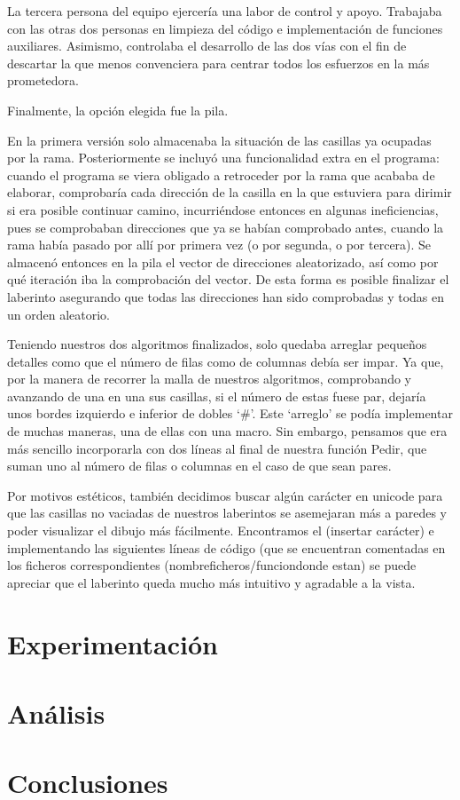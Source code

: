 \documentclass[12pt,a4paper]{article}
\begin{document}
La tercera persona del equipo ejercería una labor de control y apoyo. Trabajaba con las otras dos personas en limpieza del código e implementación de funciones auxiliares. Asimismo, controlaba el desarrollo de las dos vías con el fin de descartar la que menos convenciera para centrar todos los esfuerzos en la más prometedora.  

Finalmente, la opción elegida fue la pila.  

En la primera versión solo almacenaba la situación de las casillas ya ocupadas por la rama. Posteriormente se incluyó una funcionalidad extra en el programa: cuando el programa se viera obligado a retroceder por la rama que acababa de elaborar, comprobaría cada dirección de la casilla en la que estuviera para dirimir si era posible continuar camino, incurriéndose entonces en algunas ineficiencias, pues se comprobaban direcciones que ya se habían comprobado antes, cuando la rama había pasado por allí por primera vez (o por segunda, o por tercera). Se almacenó entonces en la pila el vector de direcciones aleatorizado, así como por qué iteración iba la comprobación del vector. De esta forma es posible finalizar el laberinto asegurando que todas las direcciones han sido comprobadas y todas en un orden aleatorio.  

Teniendo nuestros dos algoritmos finalizados, solo quedaba arreglar pequeños detalles como que el número de filas como de columnas debía ser impar. Ya que, por la manera de recorrer la malla de nuestros algoritmos, comprobando y avanzando de una en una sus casillas, si el número de estas fuese par, dejaría unos bordes izquierdo e inferior de dobles ‘\#’.  Este ‘arreglo’ se podía implementar de muchas maneras, una de ellas con una macro. Sin embargo, pensamos que era más sencillo incorporarla con dos líneas al final de nuestra función Pedir, que suman uno al número de filas o columnas en el caso de que sean pares. 

Por motivos estéticos, también decidimos buscar algún carácter en unicode para que las casillas no vaciadas de nuestros laberintos se asemejaran más a paredes y poder visualizar el dibujo más fácilmente. Encontramos el (insertar carácter) e implementando las siguientes líneas de código (que se encuentran comentadas en los ficheros correspondientes (nombreficheros/funciondonde estan) se puede apreciar que el laberinto queda mucho más intuitivo y agradable a la vista.  
\clearpage
\section{Experimentación}

\clearpage
\section{Análisis}

\clearpage
\section{Conclusiones}
\end{document}
